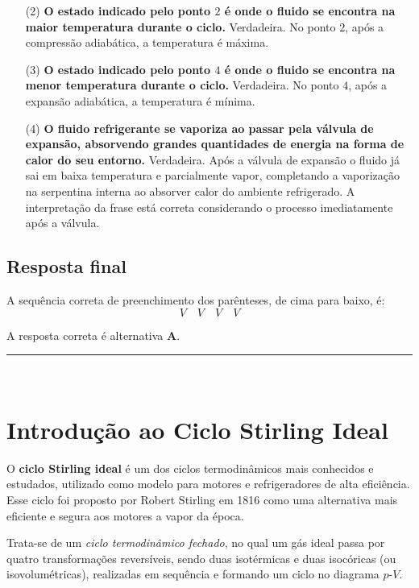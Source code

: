 \documentclass[a4paper,12pt]{article}
\begin{document}
\begin{flushleft}
\begin{itemize}
    \item[(2)] \textbf{O estado indicado pelo ponto \(2\) é onde o fluido se encontra na maior temperatura durante o ciclo.}  
    Verdadeira. No ponto \(2\), após a compressão adiabática, a temperatura é máxima.  

    \item[(3)] \textbf{O estado indicado pelo ponto \(4\) é onde o fluido se encontra na menor temperatura durante o ciclo.}  
    Verdadeira. No ponto \(4\), após a expansão adiabática, a temperatura é mínima.  

    \item[(4)] \textbf{O fluido refrigerante se vaporiza ao passar pela válvula de expansão, absorvendo grandes quantidades de energia na forma de calor do seu entorno.}  
    Verdadeira. Após a válvula de expansão o fluido já sai em baixa temperatura e parcialmente vapor, completando a vaporização na serpentina interna ao absorver calor do ambiente refrigerado. A interpretação da frase está correta considerando o processo imediatamente após a válvula.
\end{itemize}

\subsection*{Resposta final}

A sequência correta de preenchimento dos parênteses, de cima para baixo, é:
\[
\boxed{V \quad V \quad V \quad V}
\]

A resposta correta é alternativa \colorbox{green!50}{\textbf{A}}.
\end{flushleft}

\noindent\rule{\linewidth}{0.6pt}\\

\section*{Introdução ao Ciclo Stirling Ideal}

O \colorbox{yellow!30}{\textbf{ciclo Stirling ideal} é um dos ciclos termodinâmicos mais conhecidos e estudados}, utilizado como modelo para motores e refrigeradores de alta eficiência. Esse ciclo foi proposto por Robert Stirling em 1816 como uma alternativa mais eficiente e segura aos motores a vapor da época.

Trata-se de um \colorbox{green!30}{\textit{ciclo termodinâmico fechado}, no qual um gás ideal passa por quatro} \colorbox{green!30}{transformações reversíveis}, sendo duas isotérmicas e duas isocóricas (ou isovolumétricas), realizadas em sequência e formando um ciclo no diagrama \(p\)-\(V\).
\end{document}
